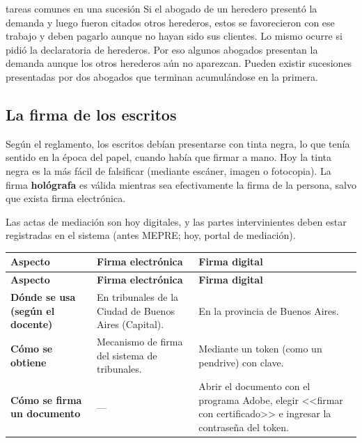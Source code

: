 \documentclass[12pt,oneside]{book}
\begin{document}
\begin{example}{tareas comunes en una sucesión}
Si el abogado de un heredero presentó la demanda y luego fueron citados otros herederos, estos se favorecieron con ese trabajo y deben pagarlo aunque no hayan sido sus clientes. Lo mismo ocurre si pidió la declaratoria de herederos. Por eso algunos abogados presentan la demanda aunque los otros herederos aún no aparezcan. Pueden existir sucesiones presentadas por dos abogados que terminan acumulándose en la primera.
\end{example}

\subsection{La firma de los escritos}

Según el reglamento, los escritos debían presentarse con tinta negra, lo que tenía sentido en la época del papel, cuando había que firmar a mano. Hoy la tinta negra es la más fácil de falsificar (mediante escáner, imagen o fotocopia). La firma \textbf{hológrafa} es válida mientras sea efectivamente la firma de la persona, salvo que exista firma electrónica.

Las actas de mediación son hoy digitales, y las partes intervinientes deben estar registradas en el sistema (antes MEPRE; hoy, portal de mediación).


\begin{longtable}{@{}L{0.18\textwidth}L{0.34\textwidth}L{0.38\textwidth}@{}}
\toprule
\textbf{Aspecto} & \textbf{Firma electrónica} & \textbf{Firma digital} \\
\midrule
\endfirsthead
\toprule
\textbf{Aspecto} & \textbf{Firma electrónica} & \textbf{Firma digital} \\
\midrule
\endhead
\bottomrule
\endlastfoot
\textbf{Dónde se usa (según el docente)} & En tribunales de la Ciudad de Buenos Aires (Capital). & En la provincia de Buenos Aires. \\
\textbf{Cómo se obtiene} & Mecanismo de firma del sistema de tribunales. & Mediante un token (como un pendrive) con clave. \\
\textbf{Cómo se firma un documento} & --- & Abrir el documento con el programa Adobe, elegir <<firmar con certificado>> e ingresar la contraseña del token. \\
\end{longtable}
\end{document}
